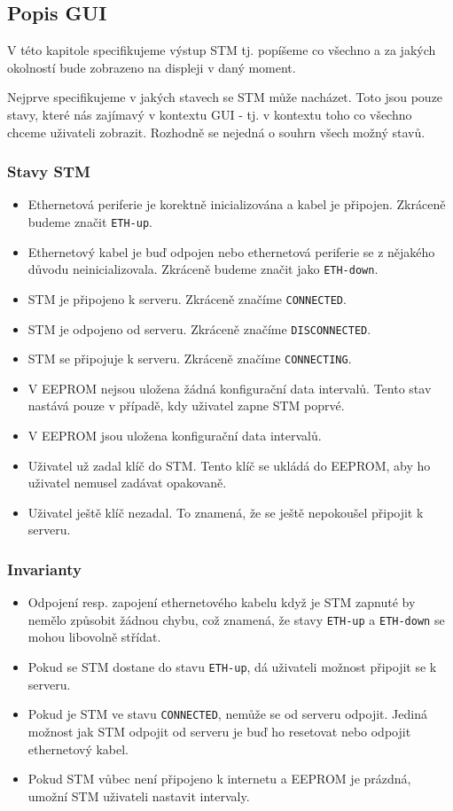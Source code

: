 
\subsection{Popis GUI} \label{popis-gui}
V této kapitole specifikujeme výstup STM tj. popíšeme co všechno a za jakých okolností
bude zobrazeno na displeji v daný moment.

Nejprve specifikujeme v jakých stavech se STM může nacházet.
Toto jsou pouze stavy, které nás zajímavý v kontextu GUI - tj. v kontextu toho co všechno chceme
uživateli zobrazit.
Rozhodně se nejedná o souhrn všech možný stavů.
\subsubsection{Stavy STM}
\begin{itemize}
  \item Ethernetová periferie je korektně inicializována a kabel je připojen. Zkráceně budeme
        značit \texttt{ETH-up}.
  \item Ethernetový kabel je buď odpojen nebo ethernetová periferie se z nějakého důvodu
        neinicializovala. Zkráceně budeme značit jako \texttt{ETH-down}.
  \item STM je připojeno k serveru. Zkráceně značíme \texttt{CONNECTED}.
  \item STM je odpojeno od serveru. Zkráceně značíme \texttt{DISCONNECTED}.
  \item STM se připojuje k serveru. Zkráceně značíme \texttt{CONNECTING}.
  \item V EEPROM nejsou uložena žádná konfigurační data intervalů. Tento stav nastává pouze v případě,
        kdy uživatel zapne STM poprvé.
  \item V EEPROM jsou uložena konfigurační data intervalů.
  \item Uživatel už zadal klíč do STM. Tento klíč se ukládá do EEPROM, aby ho uživatel
        nemusel zadávat opakovaně.
  \item Uživatel ještě klíč nezadal. To znamená, že se ještě nepokoušel připojit k serveru.
\end{itemize}

\subsubsection{Invarianty}
\begin{itemize}
  \item Odpojení resp. zapojení ethernetového kabelu když je STM zapnuté by nemělo způsobit žádnou chybu, což
    znamená, že stavy \texttt{ETH-up} a \texttt{ETH-down} se mohou libovolně střídat.
  \item Pokud se STM dostane do stavu \texttt{ETH-up}, dá uživateli možnost připojit se k serveru.
  \item Pokud je STM ve stavu \texttt{CONNECTED}, nemůže se od serveru odpojit.
    Jediná možnost jak STM odpojit od serveru je buď ho resetovat nebo odpojit ethernetový kabel.
  \item Pokud STM vůbec není připojeno k internetu a EEPROM je prázdná, umožní STM uživateli nastavit
    intervaly.
\end{itemize}

